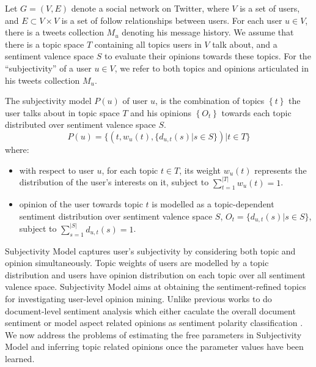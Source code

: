 \documentclass[runningheads,a4paper]{llncs}
\begin{document}
Let $G=\left( V,E \right) $ denote a social network on Twitter, where $ V $ is a set of users, and $ E\subset V\times V $ is a set of follow relationships between users. For each user $ u \in V $, there is a tweets collection $ M_{u} $ denoting his message history. We assume that there is a topic space $ T $ containing all topics users in $ V $ talk about, and a sentiment valence space $ S $ to evaluate their opinions towards these topics. 
For the ``subjectivity'' of a user $ u  \in V $, we refer to both topics and opinions articulated in his tweets collection $ M_{u} $.  
\begin{definition}
The subjectivity model $ P \left( u \right) $ of user $ u $, is the combination of topics $\left\lbrace  t \right\rbrace $ the user talks about in topic space $T$ and his opinions $\left\lbrace O_{t}\right\rbrace $ towards each topic distributed over sentiment valence space $ S $. 
\begin{equation}
\label{usermodel}
P \left( u \right) = \lbrace \left( t, w_{u} \left( t \right), \lbrace d_{u,t} \left( s \right)|s \in S \rbrace \right) |  t \in T \rbrace
\end{equation}
where:
\begin{itemize}
\item with respect to user $ u $, for each topic $t \in T$, its weight $ w_{u} \left( t \right)$ represents the distribution of the user's interests on it, subject to $ \sum_{t=1}^{|T|}w_{u} \left( t \right)=1 $.
\item opinion of the user towards topic $t$ is modelled as a topic-dependent sentiment distribution over sentiment valence space $ S $, $O_{t}=\lbrace d_{u,t} \left( s \right)|s \in S \rbrace $, subject to $ \sum_{s=1}^{|S|} d_{u,t} \left( s \right)=1$.
\end{itemize}
\end{definition}

Subjectivity Model captures user’s subjectivity by considering both topic and opinion simultaneously. Topic weights of users are modelled by a topic distribution and users have opinion distribution on each topic over all sentiment valence space. Subjectivity Model aims at obtaining the sentiment-refined topics for investigating user-level opinion mining. Unlike previous works to do document-level sentiment analysis which either caculate the overall document sentiment or model aspect related opinions as sentiment polarity classification \cite{tan2011user}.
We now address the problems of estimating the free parameters in Subjectivity Model and inferring topic related opinions once the parameter values have been learned.
\end{document}
